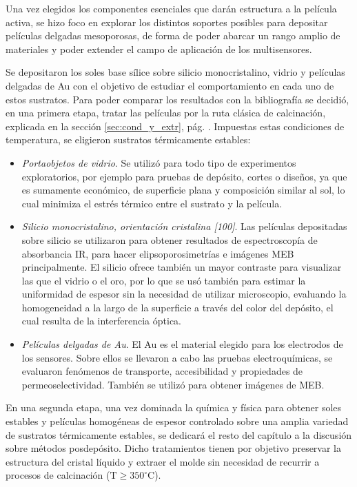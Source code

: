 	Una vez elegidos los componentes esenciales que darán estructura a la película activa, se hizo foco en explorar los distintos soportes posibles para depositar películas delgadas mesoporosas, de forma de poder abarcar un rango amplio de materiales y poder extender el campo de aplicación de los multisensores.
	
	Se depositaron los soles base sílice sobre silicio monocristalino, vidrio y películas delgadas de Au con el objetivo de estudiar el comportamiento en cada uno de estos sustratos. Para poder comparar los resultados con la bibliografía\cite{Soler-Illia2006,Brinker1990} se decidió, en una primera etapa, tratar las películas por la ruta clásica de calcinación, explicada en la sección \ref{sec:cond_y_extr}, pág. \pageref{sec:cond_y_extr}. Impuestas estas condiciones de temperatura, se eligieron sustratos térmicamente estables:

		\begin{itemize}
			\item \textit{Portaobjetos de vidrio}. Se utilizó para todo tipo de experimentos exploratorios, por ejemplo para pruebas de depósito, cortes o diseños, ya que es sumamente económico, de superficie plana y composición similar al sol, lo cual minimiza el estrés térmico entre el sustrato y la película.

			\item \textit{Silicio monocristalino, orientación cristalina [100]}. Las películas depositadas sobre silicio se utilizaron para obtener resultados de espectroscopía de absorbancia IR, para hacer elipsoporosimetrías e imágenes MEB principalmente. El silicio ofrece también un mayor contraste para visualizar las \pdm\space que el vidrio o el oro, por lo que se usó también para estimar la uniformidad de espesor sin la necesidad de utilizar microscopio, evaluando la homogeneidad a la largo de la superficie a través del color del depósito, el cual resulta de la interferencia óptica.
		
			\item \textit{Películas delgadas de Au}. El Au es el material elegido para los electrodos de los sensores. Sobre ellos se llevaron a cabo las pruebas electroquímicas, se evaluaron fenómenos de transporte, accesibilidad y propiedades de permeoselectividad. También se utilizó para obtener imágenes de MEB. 
			\end{itemize}
	
	En una segunda etapa, una vez dominada la química y física para obtener soles estables y películas homogéneas de espesor controlado sobre una amplia variedad de sustratos térmicamente estables, se dedicará el resto del capítulo a la discusión sobre métodos posdepósito. Dicho tratamientos tienen por objetivo preservar la estructura del cristal líquido y extraer el molde sin necesidad de recurrir a procesos de calcinación ($\text{T} \geq 350^\circ \text{C}$).


